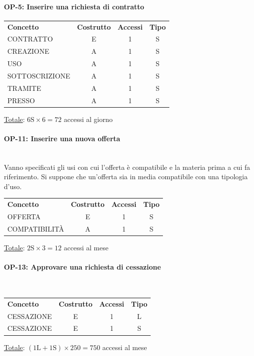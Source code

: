 \documentclass[a4paper,12pt]{report}
\begin{document}
\paragraph{OP-5: Inserire una richiesta di contratto}
\begin{center}
\begin{tabular}{@{}l c  c  c@{}}
    \hline
    \textbf{Concetto} & \textbf{Costrutto} & \textbf{Accessi} & \textbf{Tipo} \\ [0.5ex]
    CONTRATTO & E & 1 & S \\
    CREAZIONE & A & 1 & S \\
    USO & A & 1 & S \\
    SOTTOSCRIZIONE & A & 1 & S \\
    TRAMITE & A & 1 & S \\
    PRESSO & A & 1 & S \\
    \hline
\end{tabular}
\end{center}
\underline{Totale}: $6 \text{S} \times 6 = 72$ accessi al giorno 
\paragraph{OP-11: Inserire una nuova offerta}\mbox{}\\
    Vanno specificati gli usi con cui l'offerta è compatibile e la materia prima a cui fa riferimento. Si suppone che un'offerta sia in media compatibile con una tipologia d'uso.
    \begin{center}
    \begin{tabular}{@{}l c  c  c@{}}
        \hline
        \textbf{Concetto} & \textbf{Costrutto} & \textbf{Accessi} & \textbf{Tipo} \\ [0.5ex]
        OFFERTA & E & 1 & S \\
        COMPATIBILITÀ & A & 1 & S \\
        \hline
    \end{tabular}
    \end{center}
    \underline{Totale}: $2\text{S} \times 3 = 12$ accessi al mese
\paragraph{OP-13: Approvare una richiesta di cessazione}\mbox{}\\
\begin{center}
\begin{tabular}{@{}l c  c  c@{}}
    \hline
    \textbf{Concetto} & \textbf{Costrutto} & \textbf{Accessi} & \textbf{Tipo} \\ [0.5ex]
    CESSAZIONE & E & 1 & L \\
    CESSAZIONE & E & 1 & S \\
    \hline
\end{tabular}
\end{center}
\underline{Totale}: $(1\text{L} + 1\text{S}) \times 250 = 750$ accessi al mese
\end{document}
